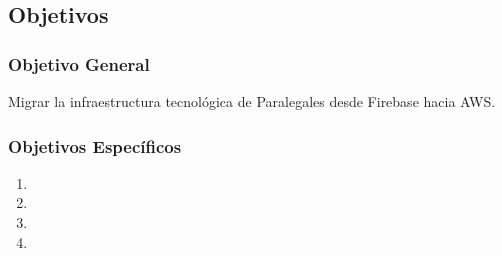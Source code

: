 \subsection{Objetivos}

\subsubsection{Objetivo General}
Migrar la infraestructura tecnológica de Paralegales desde Firebase hacia AWS.

\subsubsection{Objetivos Específicos}

\begin{enumerate}
  \item \objetivoEspecificoA
  \item \objetivoEspecificoB
  \item \objetivoEspecificoC
  \item \objetivoEspecificoD
\end{enumerate}
